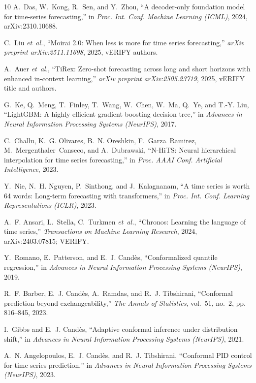 \documentclass[conference]{IEEEtran}
\begin{document}
\begin{thebibliography}{10}
A.~Das, W.~Kong, R.~Sen, and Y.~Zhou, ``A decoder-only foundation model for
  time-series forecasting,'' in \emph{Proc. Int. Conf. Machine Learning
  (ICML)}, 2024, arXiv:2310.10688.

C.~Liu \emph{et~al.}, ``{Moirai 2.0}: When less is more for time series
  forecasting,'' \emph{arXiv preprint arXiv:2511.11698}, 2025, vERIFY authors.

A.~Auer \emph{et~al.}, ``{TiRex}: Zero-shot forecasting across long and short
  horizons with enhanced in-context learning,'' \emph{arXiv preprint
  arXiv:2505.23719}, 2025, vERIFY title and authors.

G.~Ke, Q.~Meng, T.~Finley, T.~Wang, W.~Chen, W.~Ma, Q.~Ye, and T.-Y. Liu,
  ``{LightGBM}: A highly efficient gradient boosting decision tree,'' in
  \emph{Advances in Neural Information Processing Systems (NeurIPS)}, 2017.

C.~Challu, K.~G. Olivares, B.~N. Oreshkin, F.~Garza~Ramirez,
  M.~Mergenthaler~Canseco, and A.~Dubrawski, ``{N-HiTS}: Neural hierarchical
  interpolation for time series forecasting,'' in \emph{Proc. AAAI Conf.
  Artificial Intelligence}, 2023.

Y.~Nie, N.~H. Nguyen, P.~Sinthong, and J.~Kalagnanam, ``A time series is worth
  64 words: Long-term forecasting with transformers,'' in \emph{Proc. Int.
  Conf. Learning Representations (ICLR)}, 2023.

A.~F. Ansari, L.~Stella, C.~Turkmen \emph{et~al.}, ``Chronos: Learning the
  language of time series,'' \emph{Transactions on Machine Learning Research},
  2024, arXiv:2403.07815; VERIFY.

Y.~Romano, E.~Patterson, and E.~J. Cand{\`e}s, ``Conformalized quantile
  regression,'' in \emph{Advances in Neural Information Processing Systems
  (NeurIPS)}, 2019.

R.~F. Barber, E.~J. Cand{\`e}s, A.~Ramdas, and R.~J. Tibshirani, ``Conformal
  prediction beyond exchangeability,'' \emph{The Annals of Statistics},
  vol.~51, no.~2, pp. 816--845, 2023.

I.~Gibbs and E.~J. Cand{\`e}s, ``Adaptive conformal inference under
  distribution shift,'' in \emph{Advances in Neural Information Processing
  Systems (NeurIPS)}, 2021.

A.~N. Angelopoulos, E.~J. Cand{\`e}s, and R.~J. Tibshirani, ``Conformal {PID}
  control for time series prediction,'' in \emph{Advances in Neural Information
  Processing Systems (NeurIPS)}, 2023.


\end{thebibliography}
\end{document}
